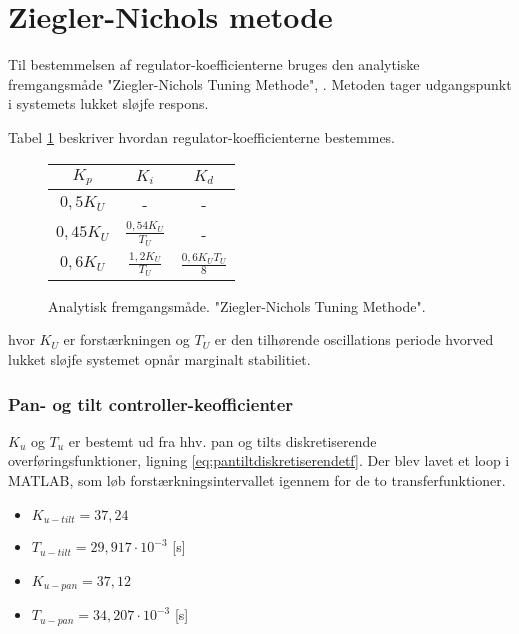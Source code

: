 \section{Ziegler-Nichols metode}
Til bestemmelsen af regulator-koefficienterne bruges den analytiske fremgangsmåde "Ziegler-Nichols Tuning Methode", \citep[Kap. 7.6]{reg_modern_control_systems}. 
Metoden tager udgangspunkt i systemets lukket sløjfe respons. 

Tabel \ref{tb:ZieglerNichols} beskriver hvordan regulator-koefficienterne bestemmes.

\begin{figure}[th!]
\centering
\begin{tabular}{c|c|c}
\(K_p\) & \(K_i\) & \(K_d\)\\\hline
\(0,5  { K }_{ U }\) &-&-\\
\(0,45  { K }_{ U }\) & \( \frac { 0,54  { K }_{ U } }{ { T }_{ U } }  \) &-\\
\(0,6  { K }_{ U } \) &  \( \frac { 1,2  { K }_{ U } }{ { T }_{ U } }  \) & \(\frac { 0,6  { K }_{ U }  { T }_{ U } }{ 8 }  \)
\end{tabular}
\captionsetup{type=table}
\caption[Ziegler-Nichols Tuning Methode]{Analytisk fremgangsmåde. "Ziegler-Nichols Tuning Methode".}
\label{tb:ZieglerNichols}
\end{figure}

hvor \(K_U\) er forstærkningen og \(T_U\) er den tilhørende oscillations periode hvorved lukket sløjfe systemet opnår marginalt stabilitiet.

\subsubsection{Pan- og tilt controller-keofficienter}
\(K_u\) og \(T_u\) er bestemt ud fra hhv. pan og tilts diskretiserende overføringsfunktioner, ligning \ref{eq:pantiltdiskretiserendetf}. 
Der blev lavet et loop i MATLAB, som løb forstærkningsintervallet igennem for de to transferfunktioner.
\begin{itemize}
\itemsep1pt
\item \(K_{u-tilt} = 37,24\)
\item \(T_{u-tilt} = 29,917 \cdot 10^{-3}\) [s] 
\item \(K_{u-pan} = 37,12\)
\item \(T_{u-pan} = 34,207\cdot 10^{-3}\) [s] 
\end{itemize}

